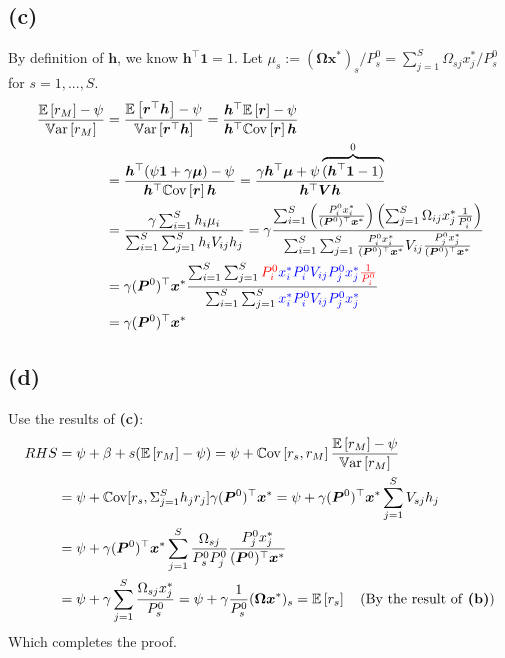 \documentclass[10pt]{article}
\begin{document}
\subsection{(c)} 

By definition of $\bm{h}$, we know $\bm{h}^{\top} \bm{1} = 1$. Let $\mu_s := (\bm{\Omega} \bm{x}^*)_s /P_s^0 = \sum_{j=1}^S \Omega_{sj}x^{*}_j / P_s^0$ for $s=1,...,S$.
\begin{equation}
  \begin{split}
    \frac{\mathbb{E}\left[r_M\right] - \psi}{\mathrm{\mathbb{V}ar}\left[r_M\right]} &= \frac{\mathbb{E}\left[\bm{r}^{\top} \bm{h}\right] - \psi}{\mathrm{\mathbb{V}ar}\left[\bm{r}^{\top} \bm{h}\right]} = \frac{\bm{h}^{\top} \mathbb{E}\left[\bm{r}\right] - \psi}{\bm{h}^{\top} \mathrm{\mathbb{C}ov}\left[\bm{r}\right] \bm{h}}\\
    &= \frac{\bm{h}^{\top} (\psi \bm{1} + \gamma \bm{\mu})- \psi}{\bm{h}^{\top} \mathrm{\mathbb{C}ov}\left[\bm{r}\right] \bm{h}}=\frac{\gamma\bm{h}^{\top} \bm{\mu} + \psi\overbrace{(\bm{h}^{\top} \bm{1} - 1)}^{0}}{\bm{h}^{\top} \bm{V}\bm{h}}\\
    &=\frac{\gamma\sum_{i=1}^S h_i \mu_i}{\sum_{i=1}^S \sum_{j=1}^S h_i V_{ij} h_j} =\gamma\frac{\sum_{i=1}^S  \left(\frac{P_i^0 x_i^*}{(\bm{P}^0)^{\top} \bm{x}^*}\right) \left(\sum_{j=1}^S \Omega_{ij}x^{*}_j \frac{1}{P_i^0}\right) }{\sum_{i=1}^S \sum_{j=1}^S \frac{P_i^0 x_i^*}{(\bm{P}^0)^{\top} \bm{x}^*} V_{ij} \frac{P_j^0 x_j^*}{(\bm{P}^0)^{\top} \bm{x}^*}}\\
    &=\gamma(\bm{P}^0)^{\top} \bm{x}^*\frac{\sum_{i=1}^S   \sum_{j=1}^S \textcolor{red}{P_i^0} \textcolor{blue}{x_i^*P_i^0V_{ij}P_j^0x^{*}_j} \textcolor{red}{\frac{1}{P_i^0}} }{\sum_{i=1}^S \sum_{j=1}^S  \textcolor{blue}{x_i^* P_i^0 V_{ij} P_j^0 x_j^*}} \\
    &=\gamma(\bm{P}^0)^{\top} \bm{x}^*
  \end{split}
\end{equation}

\subsection{(d)}
Use the results of \textbf{(c)}:
\begin{equation}
  \begin{split}
    RHS &= \psi + \beta+s (\mathbb{E}\left[r_M\right] - \psi) =\psi + \mathrm{\mathbb{C}ov}\left[r_s, r_M\right]\frac{\mathbb{E}\left[r_M\right] - \psi}{\mathrm{\mathbb{V}ar}\left[r_M\right]}\\
    &=\psi + \mathrm{\mathbb{C}ov}[r_s, \Sigma_{j=1}^S h_j r_j] \gamma(\bm{P}^0)^{\top} \bm{x}^* =\psi + \gamma(\bm{P}^0)^{\top} \bm{x}^* \sum_{j=1}^S V_{sj}h_j \\
    &=\psi + \gamma(\bm{P}^0)^{\top} \bm{x}^* \sum_{j=1}^S \frac{\Omega_{sj}}{P_s^0 P_j^0} \frac{P_j^0 x_j^*}{(\bm{P}^0)^{\top} \bm{x}^*} \\
    &=\psi + \gamma \sum_{j=1}^S \frac{\Omega_{sj}x_j^*}{P_s^0} = \psi + \gamma \frac{1}{P_s^0}(\bm{\Omega} \bm{x}^*)_s = \mathbb{E}\left[r_s\right]\quad\text{(By the result of \textbf{(b)})}
  \end{split}
\end{equation}
Which completes the proof.
    
\end{document}

